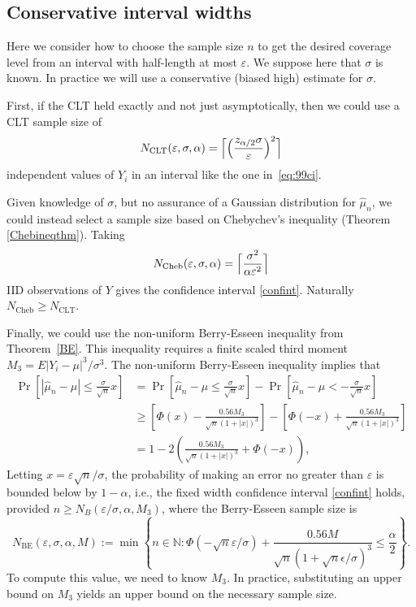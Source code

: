 \documentclass[graybox]{svmult}
\newcommand\natu{\mathbb{N}}
\newcommand{\Prob}{\Pr}
\newcommand{\abs}[1]{\left|#1\right|}
\newcommand{\hmu}{\hat{\mu}}
\def\abs#1{\ensuremath{\left \lvert #1 \right \rvert}}
\begin{document}
\subsection{Conservative interval widths}

Here we consider how to choose the sample size
$n$ to get the desired coverage level
from an interval with half-length at most $\varepsilon$.
We suppose here that $\sigma$ is known.  
In practice we will use a conservative (biased high) estimate
for $\sigma$.

First, if the CLT held exactly and not just asymptotically,
then we could use a CLT sample size of
$$
N_{\mathrm{CLT}}(\varepsilon,\sigma,\alpha)
= 
\Bigl\lceil
\Bigl(
\frac{z_{\alpha/2}\sigma}{\varepsilon}
\Bigr)^2
\Bigr\rceil
$$
independent values of $Y_i$ in an interval
like the one in~\eqref{eq:99ci}.

Given knowledge of $\sigma$, but no assurance
of a Gaussian distribution for $\hat\mu_n$, we
could instead select a sample size based on
Chebychev's inequality (Theorem \ref{Chebineqthm}).  Taking
\begin{equation}\label{NCdef}
N_{\text{Cheb}}(\varepsilon,\sigma,\alpha)
= 
\Bigl\lceil\frac{\sigma^2}{\alpha\varepsilon^2}\Bigr\rceil
\end{equation}
IID observations of $Y$ gives the confidence interval \eqref{confint}.
Naturally $N_{\text{Cheb}}\ge N_{\text{CLT}}$.

Finally, we could use the non-uniform Berry-Esseen
inequality from Theorem~\ref{BE}.
This inequality requires a finite scaled third moment
$M_3=E\abs{Y_i - \mu}^3/\sigma^3$.
The non-uniform Berry-Esseen inequality implies that
\begin{align} 
\nonumber
\Prob\left[\abs{\hmu_n - \mu}  \le \frac{\sigma}{\sqrt{n}}x\right]&=\Prob\left[\hmu_n - \mu \le \frac{\sigma}{\sqrt{n}}x\right]-\Prob\left[\hmu_n - \mu < -\frac{\sigma}{\sqrt{n}}x\right]\\ 
\nonumber
&\ge \left[\Phi(x)-\frac{0.56 M_3}{\sqrt{n}(1+\abs{x})^{3}}\right] -\left[\Phi(-x) + \frac{0.56 M_3}{\sqrt{n}(1+\abs{x})^{3}}\right]\\
&=1-2\left(\frac{0.56 M_3}{\sqrt{n}(1+\abs{x})^{3}}+\Phi(-x)\right), \label{BEresult}
\end{align}
Letting $x=\varepsilon\sqrt{n}/\sigma$, the probability of
making an error no greater than $\varepsilon$ is bounded below by $1-\alpha$, i.e., the fixed width confidence interval \eqref{confint} holds, provided $n \ge N_B(\varepsilon/\sigma,\alpha,M_3)$, where the Berry-Esseen sample size is
\begin{equation}\label{NB}
N_{\text{BE}}(\varepsilon,\sigma,\alpha,M) := \min \left \{ n \in \natu : \Phi\left(-\sqrt{n}\varepsilon/\sigma  \right)+\frac{0.56M}{\sqrt{n}\left(1+ \sqrt{n}\epsilon/\sigma \right)^{3}}
\le \frac{\alpha}{2} \right \}.
\end{equation}
To compute this value, we need to know
$M_3$. In practice, substituting an upper
bound on $M_3$ yields an upper
bound on the necessary sample size.
\end{document}
